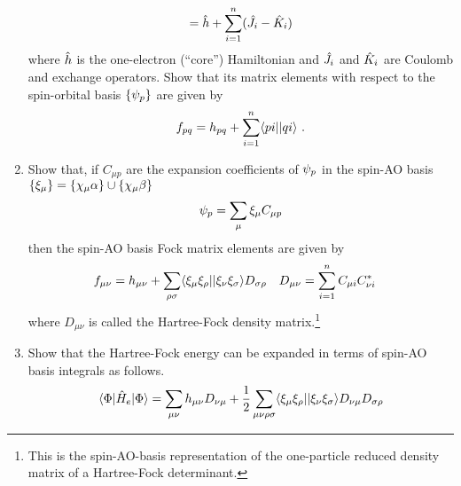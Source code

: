 \documentclass[fleqn,11pt]{article}
\begin{document}
\begin{enumerate}
\begin{align}
=
  \hat{h}
+
  \sum_{i=1}^n
  (\hat{J}_i - \hat{K}_i)
\end{align}
  where $\hat{h}$ is the one-electron (``core'') Hamiltonian and $\hat{J}_i$ and $\hat{K}_i$ are Coulomb and exchange operators.
  Show that its matrix elements with respect to the spin-orbital basis $\{\psi_p\}$ are given by
\begin{align}
  f_{pq}
=
  h_{pq}
+
  \sum_{i=1}^n
  \langle pi||qi\rangle\ .
\end{align}
  \item 
  Show that, if $C_{\mu p}$ are the expansion coefficients of $\psi_p$ in the spin-AO basis $\{\xi_\mu\}=\{\chi_\mu\alpha\}\cup\{\chi_\mu\beta\}$
\begin{align}
  \psi_p
=
  \sum_\mu \xi_\mu C_{\mu p}
\end{align}
  then the spin-AO basis Fock matrix elements are given by
\begin{align}
&
  f_{\mu\nu}
=
  h_{\mu\nu}
+
  \sum_{\rho\sigma}
  \langle\xi_\mu\xi_\rho||\xi_\nu\xi_\sigma\rangle D_{\sigma\rho}
&&
  D_{\mu\nu}
=
  \sum_{i=1}^n
  C_{\mu i}C_{\nu i}^*
\end{align}
  where $D_{\mu\nu}$ is called the Hartree-Fock density matrix.\footnote{This is the spin-AO-basis representation of the one-particle reduced density matrix of a Hartree-Fock determinant.}
\item Show that the Hartree-Fock energy can be expanded in terms of spin-AO basis integrals as follows.
\begin{align}
  \langle\Phi|\hat{H}_e|\Phi\rangle
=
  \sum_{\mu\nu}
  h_{\mu\nu}D_{\nu\mu}
+
  \dfrac{1}{2}
  \sum_{\mu\nu\rho\sigma}
  \langle\xi_\mu\xi_\rho||\xi_\nu\xi_\sigma\rangle
  D_{\nu\mu}D_{\sigma\rho}
\end{align}
\end{enumerate}
\end{document}
